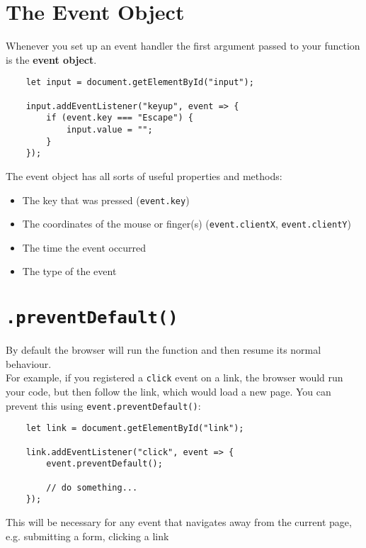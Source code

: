 \section{The Event Object}

Whenever you set up an event handler the first argument passed to your function is the \textbf{event object}.

\begin{verbatim}
    let input = document.getElementById("input");

    input.addEventListener("keyup", event => {
        if (event.key === "Escape") {
            input.value = "";
        }
    });
\end{verbatim}

The event object has all sorts of useful properties and methods:

\begin{itemize}
    \item The key that was pressed (\texttt{event.key})
    \item The coordinates of the mouse or finger(s) (\texttt{event.clientX}, \texttt{event.clientY})
    \item The time the event occurred
    \item The type of the event
\end{itemize}

\pagebreak


\section{\texttt{.preventDefault()}}

By default the browser will run the function and then resume its normal behaviour.
\\

For example, if you registered a \texttt{click} event on a link, the browser would run your code, but then follow the link, which would load a new page. You can prevent this using \texttt{event.preventDefault()}:

\begin{verbatim}
    let link = document.getElementById("link");

    link.addEventListener("click", event => {
        event.preventDefault();

        // do something...
    });
\end{verbatim}

This will be necessary for any event that navigates away from the current page, e.g. submitting a form, clicking a link



